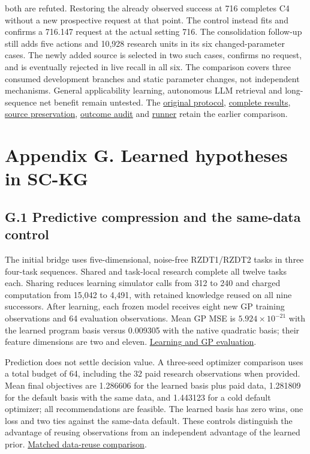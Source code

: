 \documentclass[twoside,11pt]{article}
\begin{document}
both are refuted. Restoring the already observed success at 716 completes C4 without a new prospective request at that point. The control instead fits and confirms a 716.147 request at the actual setting 716. The consolidation follow-up still adds five actions and 10,928 research units in its six changed-parameter cases. The newly added source is selected in two such cases, confirms no request, and is eventually rejected in live recall in all six. The comparison covers three consumed development branches and static parameter changes, not independent mechanisms. General applicability learning, autonomous LLM retrieval and long-sequence net benefit remain untested. The \hyperlink{artifact-169}{original protocol}, \hyperlink{artifact-170}{complete results}, \hyperlink{artifact-171}{source preservation}, \hyperlink{artifact-172}{outcome audit} and \hyperlink{artifact-173}{runner} retain the earlier comparison.


\section*{Appendix G. Learned hypotheses in SC-KG}

\subsection*{G.1 Predictive compression and the same-data control}

The initial bridge uses five-dimensional, noise-free RZDT1/RZDT2 tasks in three
four-task sequences. Shared and task-local research complete all twelve tasks
each. Sharing reduces learning simulator calls from 312 to 240 and charged
computation from 15,042 to 4,491, with retained knowledge reused on all nine
successors. After learning, each frozen model receives eight new GP training
observations and 64 evaluation observations. Mean GP MSE is
\(5.924\times10^{-21}\) with the learned program basis versus 0.009305 with the
native quadratic basis; their feature dimensions are two and eleven.
\hyperlink{artifact-174}{Learning and GP evaluation}.


Prediction does not settle decision value. A three-seed optimizer comparison
uses a total budget of 64, including the 32 paid research observations when
provided. Mean final objectives are 1.286606 for the learned basis plus paid
data, 1.281809 for the default basis with the same data, and 1.443123 for a
cold default optimizer; all recommendations are feasible. The learned basis
has zero wins, one loss and two ties against the same-data default. These
controls distinguish the advantage of reusing observations from an independent
advantage of the learned prior.
\hyperlink{artifact-175}{Matched data-reuse comparison}.
\end{document}
